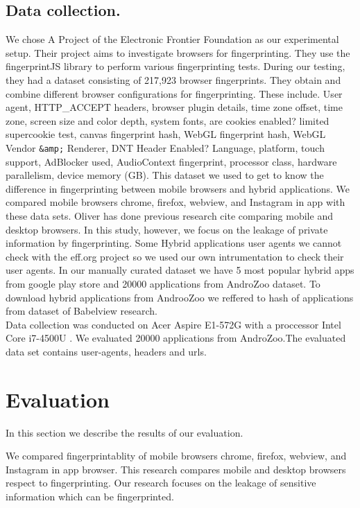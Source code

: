 \subsection{Data collection.}
We chose A Project of the Electronic Frontier Foundation as our experimental setup. Their project aims to investigate browsers for fingerprinting. They use the fingerprintJS library to perform various fingerprinting tests. During our testing, they had a dataset consisting of 217,923 browser fingerprints. They obtain and combine different browser configurations for fingerprinting. These include. 
    User agent, HTTP\_ACCEPT headers, browser plugin details, time zone offset, time zone, screen size and color depth, system fonts, are cookies enabled? limited supercookie test, canvas fingerprint hash, WebGL fingerprint hash, WebGL Vendor \texttt{\&amp;} Renderer, DNT Header Enabled?
Language, platform, touch support, AdBlocker used, AudioContext fingerprint, processor class, hardware parallelism, device memory (GB).
This dataset we used to get to know the difference in fingerprinting between mobile browsers and hybrid applications. We compared mobile browsers chrome, firefox, webview, and Instagram in app with these data sets. Oliver has done previous research cite comparing mobile and desktop browsers. In this study, however, we focus on the leakage of private information by fingerprinting. 
Some Hybrid applications user agents we cannot check with the eff.org project so we used our own intrumentation to check their user agents.
In our manually curated dataset we have 5 most popular hybrid apps from google play store and 20000 applications from AndroZoo dataset\cite{allix2016androzoo}. To download hybrid applications from AndrooZoo we reffered to hash of applications from dataset of Babelview  research\cite{rizzo2018babelview}.\\
Data collection was conducted on Acer Aspire E1-572G with a proccessor Intel Core i7-4500U . We evaluated 20000 applications from AndroZoo.The evaluated data set contains user-agents, headers and urls.

\section{Evaluation}
In this section we describe the results of our evaluation.

We compared fingerprintablity of mobile browsers chrome, firefox, webview, and Instagram in app browser. This\cite{oliver2018fingerprinting}  research  compares mobile and desktop browsers respect to fingerprinting. Our research focuses on the leakage of sensitive information which can be fingerprinted. 


